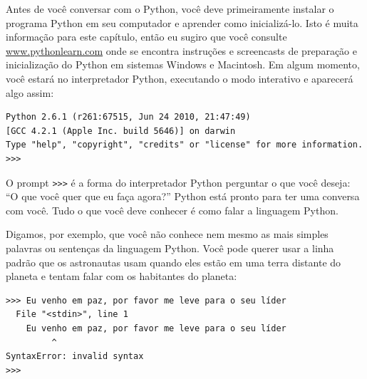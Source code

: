 Antes de você conversar com o Python, você deve primeiramente instalar o programa
Python em seu computador e aprender como inicializá-lo. Isto é muita informação
para este capítulo, então eu sugiro que você consulte \url{www.pythonlearn.com}
onde se encontra instruções e screencasts de preparação e inicialização do Python
em sistemas Windows e Macintosh. Em algum momento, você estará no interpretador
Python, executando o modo interativo e aparecerá algo assim:


\beforeverb
\begin{verbatim}
Python 2.6.1 (r261:67515, Jun 24 2010, 21:47:49)
[GCC 4.2.1 (Apple Inc. build 5646)] on darwin
Type "help", "copyright", "credits" or "license" for more information.
>>>
\end{verbatim}
\afterverb
%

O prompt {\tt >>>} é a forma do interpretador Python perguntar o que você deseja:
``O que você quer que eu faça agora?'' Python está pronto para ter uma conversa
com você. Tudo o que você deve conhecer é como falar a linguagem Python.
%

Digamos, por exemplo, que você não conhece nem mesmo as mais simples palavras
ou sentenças da linguagem Python. Você pode querer usar a linha padrão que os
astronautas usam quando eles estão em uma terra distante do planeta e tentam falar com os habitantes do planeta:
%

\beforeverb
\begin{verbatim}
>>> Eu venho em paz, por favor me leve para o seu líder
  File "<stdin>", line 1
    Eu venho em paz, por favor me leve para o seu líder
         ^
SyntaxError: invalid syntax
>>>
\end{verbatim}
\afterverb

